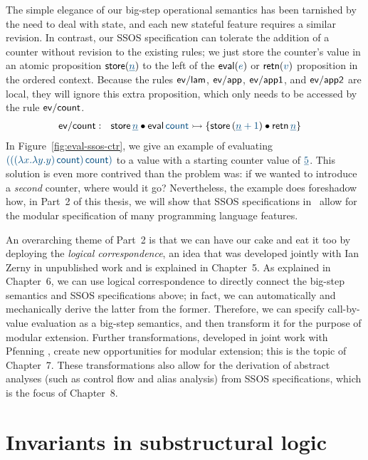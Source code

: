 The simple elegance of our big-step operational semantics has been
tarnished by the need to deal with state, and each new stateful
feature requires a similar revision.  In contrast, our SSOS
specification can tolerate the addition of a counter without revision
to the existing rules; we just store the counter's value in an atomic
proposition ${\sf store}(\obj{\underline{n}})$ to the left of the ${\sf
  eval}(\obj{e})$ or ${\sf retn}(\obj{v})$ proposition in the ordered
context. Because the rules ${\sf ev/lam}$, ${\sf ev/app}$, ${\sf
  ev/app1}$, and ${\sf ev/app2}$ are local, they will ignore this
extra proposition, which only needs to be accessed by the rule ${\sf
  ev/count}$.
\begin{align*}
{\sf ev/count} &:~~
  {\sf store}\,\obj{\underline n} \fuse {\sf eval}\,\obj{{\sf count}}
    \lefti \{ {\sf store}\,(\obj{\underline n + 1}) 
      \fuse {\sf retn}\,\obj{\underline n} \}
\end{align*}
In Figure~\ref{fig:eval-ssos-ctr}, we give an example of evaluating
$\obj{(((\lambda x.\lambda y.y)\,{\sf count})\,{\sf count})}$ to a value
with a starting counter value of $\obj{\underline 5}$. This solution is
even more contrived than the problem was: if we wanted to introduce a
{\it second} counter, where would it go? Nevertheless, the example
does foreshadow how, in Part~2 of this thesis, we will show that SSOS
specifications in \sls~allow for the modular specification of many
programming language features.


An overarching theme of Part~2 is that we can have our cake and eat it
too by deploying the {\it logical correspondence}, an idea that was
developed jointly with Ian Zerny in unpublished work and is explained
in Chapter~5. As explained in Chapter~6, we can use logical
correspondence to directly connect the big-step semantics and SSOS
specifications above; in fact, we can automatically and mechanically
derive the latter from the former. Therefore, we can specify
call-by-value evaluation as a big-step semantics, and then transform
it for the purpose of modular extension. Further transformations,
developed in joint work with Pfenning \cite{simmons11logical}, create
new opportunities for modular extension; this is the topic of
Chapter~7. These transformations also allow for the derivation of
abstract analyses (such as control flow and alias analysis) from SSOS
specifications, which is the focus of Chapter~8.

\section{Invariants in substructural logic}

